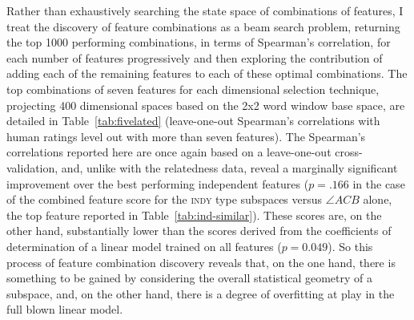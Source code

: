 Rather than exhaustively searching the state space of combinations of features, I treat the discovery of feature combinations as a beam search problem, returning the top 1000 performing combinations, in terms of Spearman's correlation, for each number of features progressively and then exploring the contribution of adding each of the remaining features to each of these optimal combinations.  The top combinations of seven features for each dimensional selection technique, projecting 400 dimensional spaces based on the 2x2 word window base space, are detailed in Table~\ref{tab:fivelated} (leave-one-out Spearman's correlations with human ratings level out with more than seven features).  The Spearman's correlations reported here are once again based on a leave-one-out cross-validation, and, unlike with the relatedness data, reveal a marginally significant improvement over the best performing independent features ($p =.166$ in the case of the combined feature score for the \textsc{indy} type subspaces versus $\angle ACB$ alone, the top feature reported in Table~\ref{tab:ind-similar}).  These scores are, on the other hand, substantially lower than the scores derived from the coefficients of determination of a linear model trained on all features ($p = 0.049$).  So this process of feature combination discovery reveals that, on the one hand, there is something to be gained by considering the overall statistical geometry of a subspace, and, on the other hand, there is a degree of overfitting at play in the full blown linear model.

